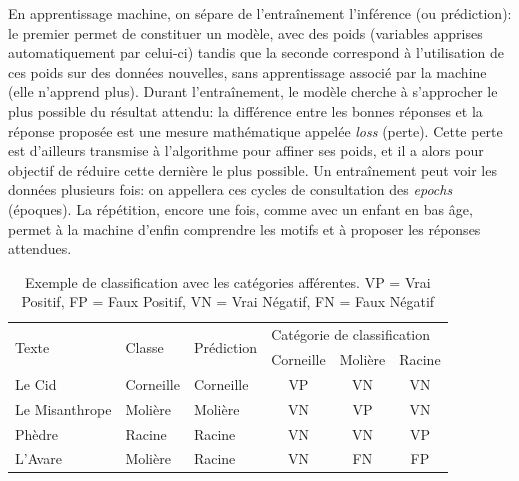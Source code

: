En apprentissage machine, on sépare de l'entraînement l'inférence (ou prédiction): le premier permet de constituer un modèle, avec des poids (variables apprises automatiquement par celui-ci) tandis que la seconde correspond à l'utilisation de ces poids sur des données nouvelles, sans apprentissage associé par la machine (elle n'apprend plus). Durant l'entraînement, le modèle cherche à s'approcher le plus possible du résultat attendu: la différence entre les bonnes réponses et la réponse proposée est une mesure mathématique appelée \textit{loss} (perte). Cette perte est d'ailleurs transmise à l'algorithme pour affiner ses poids, et il a alors pour objectif de réduire cette dernière le plus possible. Un entraînement peut voir les données plusieurs fois: on appellera ces cycles de consultation des \textit{epochs} (époques). La répétition, encore une fois, comme avec un enfant en bas âge, permet à la machine d'enfin comprendre les motifs et à proposer les réponses attendues. 

\begin{table}[]
\centering
\begin{tabular}{lllccc}
\toprule
\multirow{2}{*}{Texte} & \multirow{2}{*}{Classe} & \multirow{2}{*}{Prédiction} & \multicolumn{3}{l}{Catégorie de classification} \\
                       &                         &                             & Corneille        & Molière       & Racine       \\ \midrule
Le Cid                 & Corneille               & Corneille                   & VP               & VN            & VN           \\
Le Misanthrope         & Molière                 & Molière                     & VN               & VP            & VN           \\
Phèdre                 & Racine                  & Racine                      & VN               & VN            & VP           \\
L'Avare                & Molière                 & Racine                      & VN               & FN            & FP          \\ \bottomrule
\end{tabular}
\caption{Exemple de classification avec les catégories afférentes. VP = Vrai Positif, FP = Faux Positif, VN = Vrai Négatif, FN = Faux Négatif}
\label{deep-learning:table:true-positives}
\end{table}

